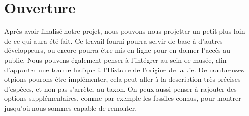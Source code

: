 \documentclass[a4paper]{article}
\begin{document}
\section{Ouverture}
	Après avoir finalisé notre projet, nous pouvons nous projetter un petit plus loin de ce qui aura été fait. Ce travail fourni pourra servir de base à d'autres développeurs, ou encore pourra être mis en ligne pour en donner l'accès au public. Nous pouvons également penser à l'intégrer au sein de musée, afin d'apporter une touche ludique à l'Histoire de l'origine de la vie.
	De nombreuses otpions pourons être implémenter, cela peut aller à la description très précises d'espèces, et non pas s'arrèter au taxon. On peux aussi penser à rajouter des options supplémentaires, comme par exemple les fossiles connus, pour montrer jusqu'où nous sommes capable de remonter.
		
\newpage

\begin{appendices} 
	
\end{appendices} 
\end{document}
